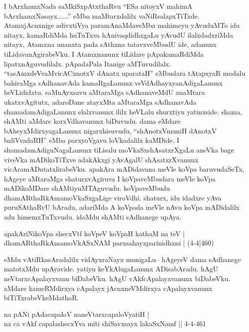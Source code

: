 \begin{artha}
I bArxhamxNada saMkiSxpAtxthaRvu ``ESa nitoyxV mahimA bArxhamxNasayx......'' eMba maMtarxdalilx vaNiRsalapxTiTxde. AtamxjAcnxnige adivxtiVya paramAnaMdaveMba mahimeyu yAvuduMTo idu nitayx, kamaRdiMda huTuTxva hAnivaqdidhxgaLu yAvudU ilalxdadxriMda nitayx, Atamxna unanxta pada sAthxna tatavxveMbudU ide, adanunx tiLidavanAgirabeVku. I Atamxnanunx tiLidare pApakamaRdiMda lipatxnAguvudilalx. pApadaPala Itanige aMTuvudilalx. ``tasAmxdeVvaMvicACxnotxV dAnatx uparataH'' eMbudara tAtapxyaR modalu bahiraMga sAdhanavAda kamaRgaLanunx veVdAdhayxyanAdigaLanunx heVLididxtu. saMnAyxsavu aMtaraMga sAdhanaveMdU anaMtara ukatxvAgitutx, adaroDane atayxMta aMtaraMga sAdhanavAda shamadamAdigaLanunx elalxvanunx ililx heVLalu shurxtiyu yatinxside. shama, shAMti aMdare korxVdhavanunx biDuvudu. dama eMdare bAheyxMdirxyagaLanunx nigarxhisuvudu, ``shAnotxVmuniH dAnotxV baliVvadaRH'' eMba parxyoVgavu loVkadalilx kaMDide. I shamadamAdiguNagaLanunx tiLisalu moVkaSxshAsatxrXgaLu aneVka bage viveVka mADikoTiTxve adakAkxgi yAvAgalU shAsatxrXvanunx vicAramADutatxlirabeVku. apakAra mADidavana meVle koVpa baruvudaSeTx, hAgeye aMtaraMga shaturxvAgiruva I koVpaveMbudara meVle koVpa mADikoMDare shAMtiyuMTAguvudu. koVpaveMbudu dhamARthaRkAmamoVkaSxgaLige viroVdhi. shaturx, idu idadxre yAva puruSAthaRvU bAradu, adariMda A koVpada meVle nAvu koVpa mADidalilx adu himemxTuTxvudu. idoMdu shAMti sAdhanege upAya. 
\end{artha}

\begin{shl}
apakAriNikoVpa shecxVtf koVpeV koVpaH kathaM na teV |\\
dhamARthaRkAmamoVkASxNAM parxsahayxparinidhxni | (4-4|460)
\end{shl}

\begin{artha}
eMdu vAtiRkasAradalilx vidAyxraNayx munigaLu{\rm --} hAgeyeV dama sAdhanege matotxMdu upAyavide. yatiyu keYkAlugaLanunx ADisabAradu. hAgU neVtarxcApalayxvanu biDabeVku. hAgU vAkfcApalayxvanunx biDabeVku. aMdare kameRMdirxya cApalayx jAcnxneVMdirxya cApalayxvanunx biTiTxrabeVkeMdathaR. 
\end{artha}

\begin{shl}
na pANi pAdacapaloV naneVtarxcapaloVyatiH |\\
na ca vAkf capalashecxYva miti shiSavxsayx lakaSxNamf || 4-4-461
\end{shl}


